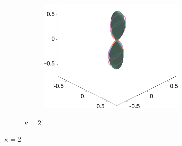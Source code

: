 \begin{figure}
\begin{subfigure}[]{\textwidth}
\begin{subfigure}[]{0.32\textwidth}
    \includegraphics[width=\textwidth]{figures/frf_experiment/fibres_fod_3D_kappa2_b_3000n_4}
  \end{subfigure}
  \caption{$\kappa = 2$}
  \end{subfigure}


\end{figure}
